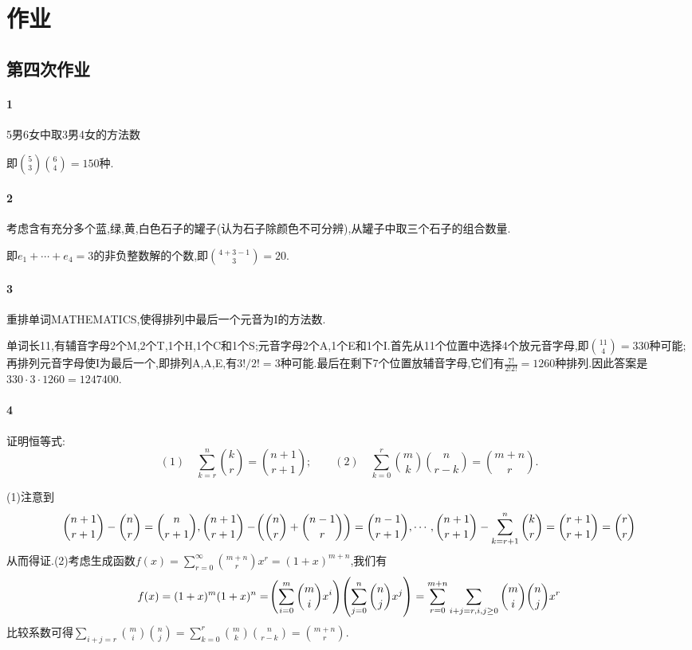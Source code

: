 \documentclass[11pt]{article}
\begin{document}
\tableofcontents

\section{作业}
\subsection{第四次作业}
\paragraph{1}5男6女中取3男4女的方法数

即$\binom{5}{3}\binom{6}{4}=150$种.

\paragraph{2}考虑含有充分多个蓝,绿,黄,白色石子的罐子(认为石子除颜色不可分辨),从罐子中取三个石子的组合数量.

即$e_1+\cdots+e_4=3$的非负整数解的个数,即$\binom{4+3-1}{3}=20$.

\paragraph{3}重排单词MATHEMATICS,使得排列中最后一个元音为I的方法数.

单词长11,有辅音字母2个M,2个T,1个H,1个C和1个S;元音字母2个A,1个E和1个I.首先从11个位置中选择4个放元音字母,即$\binom{11}{4}=330$种可能;再排列元音字母使I为最后一个,即排列A,A,E,有$3!/2!=3$种可能.最后在剩下7个位置放辅音字母,它们有$\frac{7!}{2!2!}=1260$种排列.因此答案是$330\cdot 3\cdot 1260=1247400$.

\paragraph{4}证明恒等式:
$$(1)\quad \sum_{k=r}^n \binom{k}{r}=\binom{n+1}{r+1};\qquad (2)\quad \sum_{k=0}^r \binom{m}{k}\binom{n}{r-k}=\binom{m+n}{r}.$$

(1)注意到
$$\binom{n+1}{r+1}-\binom{n}{r}=\binom{n}{r+1}, \binom{n+1}{r+1}-\!\left(\binom{n}{r}+\binom{n-1}{r}\right)=\binom{n-1}{r+1},\cdots, \binom{n+1}{r+1}-\sum_{k=r+1}^{n}\binom{k}{r}=\binom{r+1}{r+1}=\binom{r}{r}$$
从而得证.(2)考虑生成函数$f(x)=\sum_{r=0}^{\infty}\binom{m+n}{r}x^r=(1+x)^{m+n}$,我们有
$$f(x)=(1+x)^m(1+x)^n=\!\left(\sum_{i=0}^{m}\binom{m}{i}x^i\right)\!\left(\sum_{j=0}^{n}\binom{n}{j}x^j\right)=\sum_{r=0}^{m+n}\sum_{i+j=r, i,j\geq 0}\binom{m}{i}\binom{n}{j}x^r$$
比较系数可得$\sum_{i+j=r}\binom{m}{i}\binom{n}{j}=\sum_{k=0}^{r}\binom{m}{k}\binom{n}{r-k}=\binom{m+n}{r}$.
\end{document}

